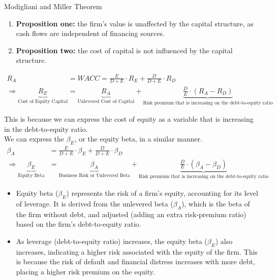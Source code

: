 \begin{theorembox}{Modigliani and Miller Theorem}
    \begin{enumerate}
        \item \textbf{Proposition one: } the firm's value is unaffected by the capital structure, as cash flows are independent of financing sources.
        \item \textbf{Proposition two: } the cost of capital is not influenced by the capital structure.
        
    \end{enumerate}
    \begin{align}
        R_A &= WACC= \frac{E}{D+E} \cdot R_E + \frac{D}{D+E} \cdot R_D\\
        \Rightarrow \underbrace{R_E}_{\text{Cost of Equity Capital}} &= \underbrace{R_A}_{\text{Unlevered Cost of Capital}} + \underbrace{\frac{D}{E} \cdot (R_A - R_D)}_{\text{Risk premium that is increasing on the debt-to-equity ratio}}
    \end{align}

    This is because we can express the cost of equity as a variable that is increasing in the debt-to-equity ratio.\\

    We can express the $\beta_E$, or the equity beta, in a similar manner.
    \begin{align}
        \beta_A &= \frac{E}{D+E} \cdot \beta_E + \frac{D}{D+E} \cdot \beta_D\\
        \Rightarrow \underbrace{\beta_E}_{\text{Equity Beta}} &= \underbrace{\beta_A}_{\text{Business Risk or Unlevered Beta}} + \underbrace{\frac{D}{E} \cdot (\beta_A - \beta_D)}_{\text{Risk premium that is increasing on the debt-to-equity ratio}}
    \end{align}
\begin{itemize}
    \item Equity beta ($\beta_E$) represents the risk of a firm's equity, accounting for its level of leverage. It is derived from the unlevered beta ($\beta_A$), which is the beta of the firm without debt, and adjusted (adding an extra risk-premium ratio) based on the firm's debt-to-equity ratio. 

    \item As leverage (debt-to-equity ratio) increases, the equity beta ($\beta_E$) also increases, indicating a higher risk associated with the equity of the firm. This is because the risk of default and financial distress increases with more debt, placing a higher risk premium on the equity.
\end{itemize}

\end{theorembox}

